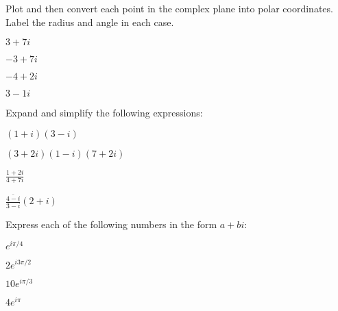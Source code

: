 

\begin{problem}
\item Plot and then convert each point in the complex plane into polar
  coordinates. Label the radius and angle in each case.

  \begin{subproblem}
  \item $3+7i$
    \vfill

  \item $-3+7i$
    \vfill
      
  \item $-4+2i$
    \vfill

  \item $3-1i$
    \vfill

  \end{subproblem}
\end{problem}


  \begin{problem}
  \item Expand and simplify the following expressions:
    \begin{subproblem}
      \item $(1+i)(3-i)$
        \vfill

      \item $(3+2i)(1-i)(7+2i)$
        \vfill

      \item $\frac{1+2i}{4+7i}$
        \vfill

      \item $\frac{\bar{4-i}}{3-i}(2+i)$
        \vfill

    \end{subproblem}

    \clearpage

  \item Express each of the following numbers in the form $a+bi$:
    \begin{subproblem}
    \item $e^{i\pi/4}$
      \vfill
    \item $2e^{i 3\pi/2}$
      \vfill
    \item $10e^{i \pi/3}$
      \vfill
    \item $4e^{i \pi}$
      \vfill
    \end{subproblem}


  \end{problem}


